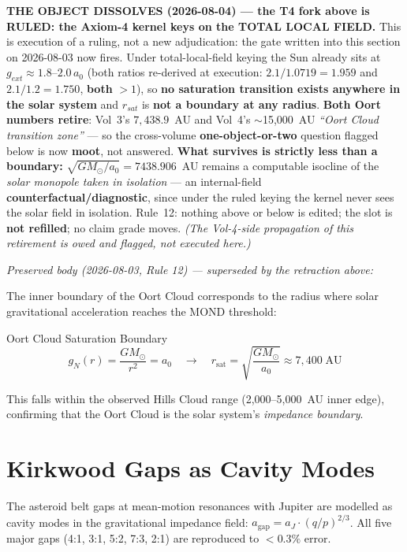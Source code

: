 \medskip
\noindent\textbf{THE OBJECT DISSOLVES (2026-08-04) --- the T4 fork above is
RULED: the Axiom-4 kernel keys on the TOTAL LOCAL FIELD.}  This is execution of
a ruling, not a new adjudication: the gate written into this section on
2026-08-03 now fires.  Under total-local-field keying the Sun already sits at
$g_{ext} \approx 1.8$--$2.0\,a_0$ (both ratios re-derived at execution:
$2.1/1.0719 = 1.959$ and $2.1/1.2 = 1.750$, \textbf{both} $>1$), so
\textbf{no saturation transition exists anywhere in the solar system} and
$r_{sat}$ is \textbf{not a boundary at any radius}.  \textbf{Both Oort numbers
retire}: Vol~3's $7{,}438.9$~AU and Vol~4's $\sim$15,000~AU
\emph{``Oort Cloud transition zone''} --- so the cross-volume
\textbf{one-object-or-two} question flagged below is now \textbf{moot}, not
answered.  \textbf{What survives is strictly less than a boundary:}
$\sqrt{GM_\odot/a_0} = 7438.906$~AU remains a computable isocline of the
\emph{solar monopole taken in isolation} --- an internal-field
\textbf{counterfactual/diagnostic}, since under the ruled keying the kernel
never sees the solar field in isolation.  Rule~12: nothing above or below is
edited; the slot is \textbf{not refilled}; no claim grade moves.  \emph{(The
Vol-4-side propagation of this retirement is owed and flagged, not executed
here.)}

\medskip
\noindent\emph{Preserved body (2026-08-03, Rule 12) --- superseded by the
retraction above:}

The inner boundary of the Oort Cloud corresponds to the radius where
solar gravitational acceleration reaches the MOND threshold:
\begin{resultbox}{Oort Cloud Saturation Boundary}
\begin{equation}
    g_N(r) = \frac{GM_\odot}{r^2} = a_0
    \quad\longrightarrow\quad
    r_{\text{sat}} = \sqrt{\frac{GM_\odot}{a_0}}
    \approx 7{,}400\;\text{AU}
    \label{eq:oort_saturation}
\end{equation}
\end{resultbox}
This falls within the observed Hills Cloud range (2,000--5,000~AU inner edge),
confirming that the Oort Cloud is the solar system's \textit{impedance boundary}.

\section{Kirkwood Gaps as Cavity Modes}
\label{sec:kirkwood}

The asteroid belt gaps at mean-motion resonances with Jupiter are
modelled as cavity modes in the gravitational impedance field:
$a_{\text{gap}} = a_J \cdot (q/p)^{2/3}$.  All five major gaps
(4:1, 3:1, 5:2, 7:3, 2:1) are reproduced to $< 0.3\%$ error.


